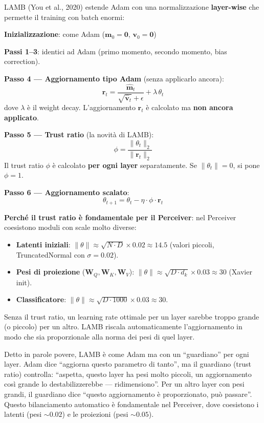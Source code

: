 \documentclass[12pt,a4paper]{article}
\begin{document}
LAMB (You et al., 2020) estende Adam con una normalizzazione \textbf{layer-wise} che permette il training con batch enormi:

\begin{formulabox}
\textbf{Inizializzazione}: come Adam ($\mathbf{m}_0 = \mathbf{0}$, $\mathbf{v}_0 = \mathbf{0}$)

\textbf{Passi 1--3}: identici ad Adam (primo momento, secondo momento, bias correction).

\textbf{Passo 4 --- Aggiornamento tipo Adam} (senza applicarlo ancora):
\[
    \mathbf{r}_t = \frac{\hat{\mathbf{m}}_t}{\sqrt{\hat{\mathbf{v}}_t} + \epsilon} + \lambda \, \theta_t
\]
dove $\lambda$ \`e il weight decay. L'aggiornamento $\mathbf{r}_t$ \`e calcolato ma \textbf{non ancora applicato}.

\textbf{Passo 5 --- Trust ratio} (la novit\`a di LAMB):
\[
    \phi = \frac{\|\theta_t\|_2}{\|\mathbf{r}_t\|_2}
\]
Il trust ratio $\phi$ \`e calcolato \textbf{per ogni layer} separatamente. Se $\|\theta_t\| = 0$, si pone $\phi = 1$.

\textbf{Passo 6 --- Aggiornamento scalato}:
\[
    \theta_{t+1} = \theta_t - \eta \cdot \phi \cdot \mathbf{r}_t
\]
\end{formulabox}

\textbf{Perch\'e il trust ratio \`e fondamentale per il Perceiver}: nel Perceiver coesistono moduli con scale molto diverse:
\begin{itemize}
    \item \textbf{Latenti iniziali}: $\|\theta\| \approx \sqrt{N \cdot D} \times 0.02 \approx 14.5$ (valori piccoli, TruncatedNormal con $\sigma = 0.02$).
    \item \textbf{Pesi di proiezione} ($\mathbf{W}_Q, \mathbf{W}_K, \mathbf{W}_V$): $\|\theta\| \approx \sqrt{D \cdot d_k} \times 0.03 \approx 30$ (Xavier init).
    \item \textbf{Classificatore}: $\|\theta\| \approx \sqrt{D \cdot 1000} \times 0.03 \approx 30$.
\end{itemize}
Senza il trust ratio, un learning rate ottimale per un layer sarebbe troppo grande (o piccolo) per un altro. LAMB riscala automaticamente l'aggiornamento in modo che sia proporzionale alla norma dei pesi di quel layer.

\begin{notabox}
Detto in parole povere, LAMB \`e come Adam ma con un ``guardiano'' per ogni layer. Adam dice ``aggiorna questo parametro di tanto'', ma il guardiano (trust ratio) controlla: ``aspetta, questo layer ha pesi molto piccoli, un aggiornamento cos\`i grande lo destabilizzerebbe --- ridimensiono''. Per un altro layer con pesi grandi, il guardiano dice ``questo aggiornamento \`e proporzionato, pu\`o passare''. Questo bilanciamento automatico \`e fondamentale nel Perceiver, dove coesistono i latenti (pesi $\sim 0.02$) e le proiezioni (pesi $\sim 0.05$).
\end{notabox}
\end{document}
